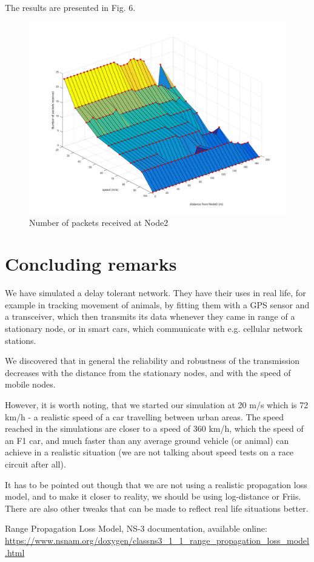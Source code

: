 \documentclass[11pt,journal]{article}
\begin{document}
	The results are presented in Fig. 6.
		\begin{figure}[h]
		\centering
		\includegraphics[scale=0.4]{graph3b.png}
		\caption{Number of packets received at Node2}
	\end{figure}
	
	\section{Concluding remarks}
	
	We have simulated a delay tolerant network. They have their uses in real life, for example in tracking movement of animals, by fitting them with a GPS sensor and a transceiver, which then transmits its data whenever they came in range of a stationary node, or in smart cars, which communicate with e.g. cellular network stations. 
	
	We discovered that in general the reliability and robustness of the transmission decreases with the distance from the stationary nodes, and with the speed of mobile nodes.
	
	However, it is worth noting, that we started our simulation at 20 m/s which is 72 km/h - a realistic speed of a car travelling between urban areas. The speed reached in the simulations are closer to a speed of 360 km/h, which the speed of an F1 car, and much faster than any average ground vehicle (or animal) can achieve in a realistic situation (we are not talking about speed tests on a race circuit after all).
	
	It has to be pointed out though that we are not using a realistic propagation loss model, and to make it closer to reality, we should be using log-distance or Friis. There are also other tweaks that can be made to reflect real life situations better.
	
	\pagebreak
	\begin{thebibliography}{1}
		Range Propagation Loss Model, NS-3 documentation, available online: \url{https://www.nsnam.org/doxygen/classns3_1_1_range_propagation_loss_model.html}
	\end{thebibliography}
\end{document}
